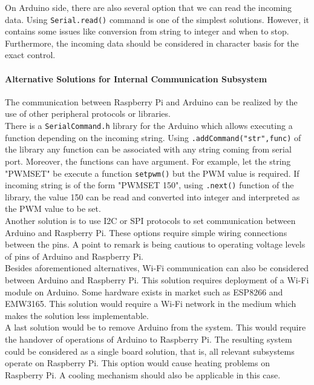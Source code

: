 \documentclass[a4paper,12pt]{article}
\begin{document}
\begin{enumerate}
	On Arduino  side, there are also several option that we can read the incoming data. Using \texttt{Serial.read()}  command is one of the simplest solutions. However, it contains some issues like conversion from string to integer and when to stop. Furthermore, the incoming data should be considered in character basis for the exact control.  
	
	\paragraph*{Alternative Solutions for Internal Communication Subsystem}
		The communication between Raspberry Pi and Arduino can be realized by the use of other peripheral protocols or libraries.\\
	
		There is a \texttt{SerialCommand.h} library for the Arduino which allows executing a function depending on the incoming string. Using \lstinline|.addCommand("str",func)| of the library any function can be associated with any string coming from serial port. Moreover, the functions can have argument. For example, let the string "PWMSET" be execute a function \lstinline|setpwm()| but the PWM value is required. If incoming string is of the form "PWMSET 150", using \lstinline|.next()| function of the library, the value 150 can be read and converted into integer and interpreted as the PWM value to be set.\\
		
		Another solution is to use I2C or SPI protocols to set communication between Arduino and Raspberry Pi. These options require simple wiring connections between the pins. A point to remark is being cautious to operating voltage levels of pins of Arduino and Raspberry Pi.\\
		
		Besides aforementioned alternatives, Wi-Fi communication can also be considered between Arduino and Raspberry Pi. This solution requires deployment of a Wi-Fi module on Arduino. Some hardware exists in market such as ESP8266 and EMW3165. This solution would require a Wi-Fi network in the medium which makes the solution less implementable.\\
		
		A last solution would be to remove Arduino from the system. This would require the handover of operations of Arduino to Raspberry Pi. The resulting system could be considered as a single board solution, that is, all relevant subsystems operate on Raspberry Pi. This option would cause heating problems on Raspberry Pi. A cooling mechanism should also be applicable in this case.
		

\end{enumerate}
\end{document}
